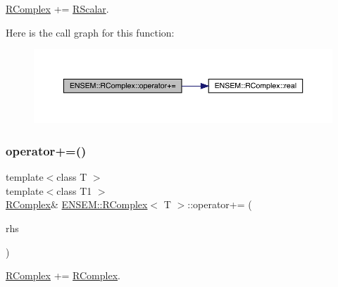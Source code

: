 \mbox{\hyperlink{classENSEM_1_1RComplex}{R\+Complex}} += \mbox{\hyperlink{classENSEM_1_1RScalar}{R\+Scalar}}. 

Here is the call graph for this function\+:
\nopagebreak
\begin{figure}[H]
\begin{center}
\leavevmode
\includegraphics[width=350pt]{d9/d0e/classENSEM_1_1RComplex_a0a7beaab81b8f5e2129a4c7b1074f85c_cgraph}
\end{center}
\end{figure}
\mbox{\label{classENSEM_1_1RComplex_aca53957ad00d064844898e907e6f6fab}} 
\subsubsection{\texorpdfstring{operator+=()}{operator+=()}\hspace{0.1cm}{\footnotesize\ttfamily [4/6]}}
{\footnotesize\ttfamily template$<$class T $>$ \\
template$<$class T1 $>$ \\
\mbox{\hyperlink{classENSEM_1_1RComplex}{R\+Complex}}\& \mbox{\hyperlink{classENSEM_1_1RComplex}{E\+N\+S\+E\+M\+::\+R\+Complex}}$<$ T $>$\+::operator+= (\begin{DoxyParamCaption}\item[{const \mbox{\hyperlink{classENSEM_1_1RComplex}{R\+Complex}}$<$ T1 $>$ \&}]{rhs }\end{DoxyParamCaption})\hspace{0.3cm}{\ttfamily [inline]}}



\mbox{\hyperlink{classENSEM_1_1RComplex}{R\+Complex}} += \mbox{\hyperlink{classENSEM_1_1RComplex}{R\+Complex}}. 

